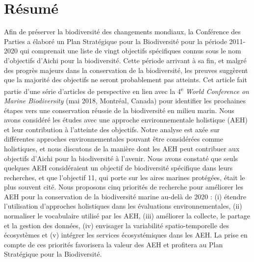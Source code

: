 \label{ann1}
\addtocounter{chapter}{1}
\setcounter{section}{0}

\section{Résumé}
Afin de préserver la biodiversité des changements mondiaux, la Conférence des Parties a élaboré un Plan Stratégique pour la Biodiversité pour la période 2011-2020 qui comprenait une liste de vingt objectifs spécifiques connus sous le nom d'objectifs d'Aichi pour la biodiversité. Cette période arrivant à sa fin, et malgré des progrès majeurs dans la conservation de la biodiversité, les preuves suggèrent que la majorité des objectifs ne seront probablement pas atteints. Cet article fait partie d'une série d'articles de perspective en lien avec la 4\textsuperscript{e} \textit{World Conference on Marine Biodiversity} (mai 2018, Montréal, Canada) pour identifier les prochaines étapes vers une conservation réussie de la biodiversité en milieu marin. Nous avons considéré les études avec une approche environnementale holistique (AEH) et leur contribution à l'atteinte des objectifs. Notre analyse est axée sur différentes approches environnementales pouvant être considérées comme holistiques, et nous discutons de la manière dont les AEH peut contribuer aux objectifs d'Aichi pour la biodiversité à l'avenir. Nous avons constaté que seuls quelques AEH considéraient un objectif de biodiversité spécifique dans leurs recherches, et que l'objectif 11, qui porte sur les aires marines protégées, était le plus souvent cité. Nous proposons cinq priorités de recherche pour améliorer les AEH pour la conservation de la biodiversité marine au-delà de 2020 : (i) étendre l'utilisation d'approches holistiques dans les évaluations environnementales, (ii) normaliser le vocabulaire utilisé par les AEH, (iii) améliorer la collecte, le partage et la gestion des données, (iv) envisager la variabilité spatio-temporelle des écosystèmes et (v) intégrer les services écosystémiques dans les AEH. La prise en compte de ces priorités favorisera la valeur des AEH et profitera au Plan Stratégique pour la Biodiversité.

